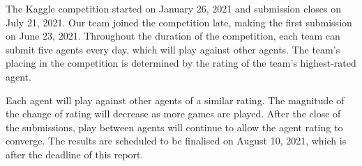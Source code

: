 The Kaggle competition started on January 26, 2021 and submission closes on July 21, 2021. Our team joined the competition late, making the first submission on June 23, 2021. Throughout the duration of the competition, each team can submit five agents every day, which will play against other agents. The team's placing in the competition is determined by the rating of the team's highest-rated agent.

Each agent will play against other agents of a similar rating. The magnitude of the change of rating will decrease as more games are played. After the close of the submissions, play between agents will continue to allow the agent rating to converge. The results are scheduled to be finalised on August 10, 2021, which is after the deadline of this report.


